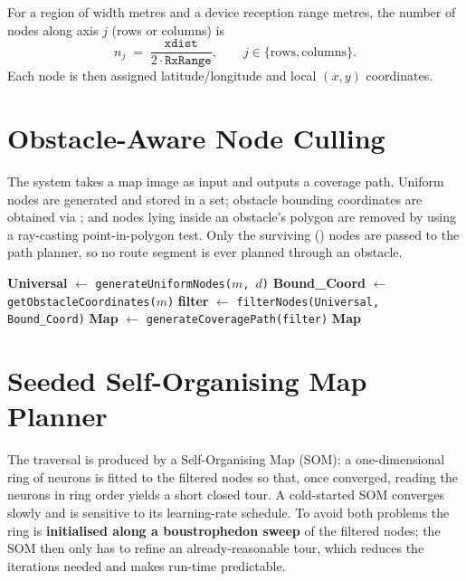 For a region of width  metres and a device reception range
 metres, the number of nodes along axis $j$ (rows or columns) is
\begin{equation}
  n_j \;=\; \frac{\texttt{xdist}}{2 \cdot \texttt{RxRange}} , \qquad j \in \{\text{rows},\text{columns}\}.
\end{equation}
Each node is then assigned latitude/longitude and local $(x,y)$ coordinates.

\section{Obstacle-Aware Node Culling}
The system takes a map image as input and outputs a coverage path. Uniform nodes
are generated and stored in a  set; obstacle bounding coordinates
are obtained via ; and nodes lying inside an
obstacle's polygon are removed by  using a ray-casting
point-in-polygon test. Only the surviving () nodes are passed to the
path planner, so no route segment is ever planned through an obstacle.

\begin{algorithm}[H]
\caption{Obstacle-aware coverage map generation}
\textbf{Universal} $\leftarrow$ \texttt{generateUniformNodes($m$, $d$)}\;
\textbf{Bound\_Coord} $\leftarrow$ \texttt{getObstacleCoordinates($m$)}\;
\textbf{filter} $\leftarrow$ \texttt{filterNodes(Universal, Bound\_Coord)} 
\textbf{Map} $\leftarrow$ \texttt{generateCoveragePath(filter)}\;
\Return \textbf{Map}\;
\end{algorithm}

\section{Seeded Self-Organising Map Planner}
The traversal is produced by a Self-Organising Map (SOM): a one-dimensional ring
of neurons is fitted to the filtered nodes so that, once converged, reading the
neurons in ring order yields a short closed tour. A cold-started SOM converges
slowly and is sensitive to its learning-rate schedule. To avoid both problems the
ring is \textbf{initialised along a boustrophedon sweep} of the filtered nodes;
the SOM then only has to refine an already-reasonable tour, which reduces the
iterations needed and makes run-time predictable.

